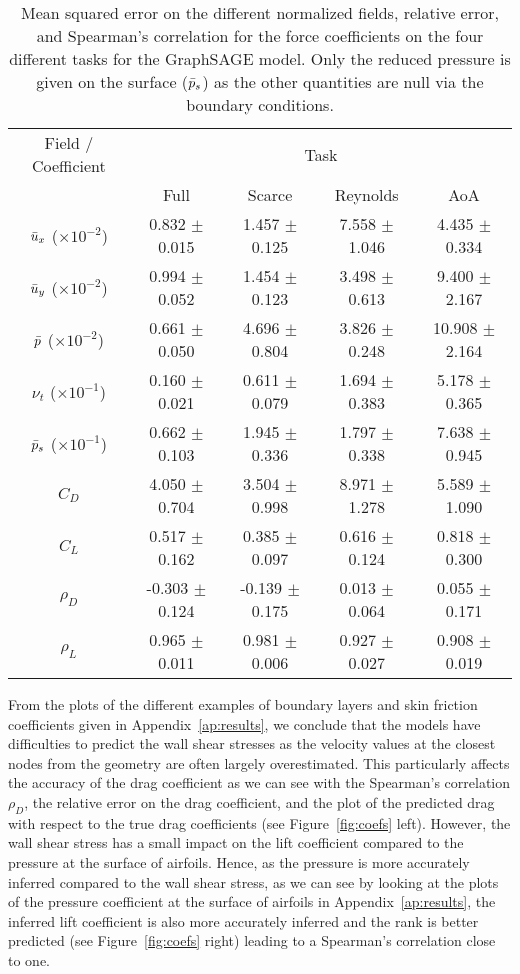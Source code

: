 \begin{table}
	\caption{Mean squared error on the different normalized fields, relative error, and Spearman's correlation for the force coefficients on the four different tasks for the GraphSAGE model. Only the reduced pressure is given on the surface ($\Bar{p}_s$) as the other quantities are null via the boundary conditions.}
	\label{tab:score_GSAGE}
	\centering
	\begin{tabular}{ccccc}
		\toprule
		Field / Coefficient & \multicolumn{4}{c}{Task}  \\
		& Full & Scarce & Reynolds & AoA \\
		\midrule
		$\Bar{u}_x$ ($\times 10^{-2}$) & 0.832 $\pm$ 0.015 & 1.457 $\pm$ 0.125 & 7.558 $\pm$ 1.046 & 4.435 $\pm$ 0.334 \\
		$\Bar{u}_y$ ($\times 10^{-2}$) & 0.994 $\pm$ 0.052 & 1.454 $\pm$ 0.123 & 3.498 $\pm$ 0.613 & 9.400 $\pm$ 2.167 \\
		$\Bar{p}$ ($\times 10^{-2}$) & 0.661 $\pm$ 0.050 & 4.696 $\pm$ 0.804 & 3.826 $\pm$ 0.248 & 10.908 $\pm$ 2.164 \\
		$\nu_t$ ($\times 10^{-1}$) & 0.160 $\pm$ 0.021 & 0.611 $\pm$ 0.079 & 1.694 $\pm$ 0.383 & 5.178 $\pm$ 0.365 \\
		$\Bar{p}_s$ ($\times 10^{-1}$) & 0.662 $\pm$ 0.103 & 1.945 $\pm$ 0.336 & 1.797 $\pm$ 0.338 & 7.638 $\pm$ 0.945 \\
		\midrule
		$C_D$ & 4.050 $\pm$ 0.704 & 3.504 $\pm$ 0.998 & 8.971 $\pm$ 1.278 & 5.589 $\pm$ 1.090 \\
		$C_L$ & 0.517 $\pm$ 0.162 & 0.385 $\pm$ 0.097 & 0.616 $\pm$ 0.124 & 0.818 $\pm$ 0.300 \\
		$\rho_D$ & -0.303 $\pm$ 0.124 & -0.139 $\pm$ 0.175 & 0.013 $\pm$ 0.064 & 0.055 $\pm$ 0.171 \\
		$\rho_L$ & 0.965 $\pm$ 0.011 & 0.981 $\pm$ 0.006 & 0.927 $\pm$ 0.027 & 0.908 $\pm$ 0.019 \\
		\bottomrule
	\end{tabular}
\end{table}

From the plots of the different examples of boundary layers and skin friction coefficients given in Appendix~\ref{ap:results}, we conclude that the models have difficulties to predict the wall shear stresses as the velocity values at the closest nodes from the geometry are often largely overestimated. This particularly affects the accuracy of the drag coefficient as we can see with the Spearman's correlation $\rho_D$, the relative error on the drag coefficient, and the plot of the predicted drag with respect to the true drag coefficients (see Figure~\ref{fig:coefs} left). However, the wall shear stress has a small impact on the lift coefficient compared to the pressure at the surface of airfoils. Hence, as the pressure is more accurately inferred compared to the wall shear stress, as we can see by looking at the plots of the pressure coefficient at the surface of airfoils in Appendix~\ref{ap:results}, the inferred lift coefficient is also more accurately inferred and the rank is better predicted (see Figure~\ref{fig:coefs} right) leading to a Spearman's correlation close to one.

